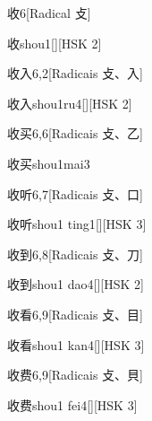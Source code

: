 \begin{entry}{收}{6}[Radical ⽁]
  \begin{phonetics}{收}{shou1}[][HSK 2]
  \end{phonetics}
\end{entry}

\begin{entry}{收入}{6,2}[Radicais ⽁、⼊]
  \begin{phonetics}{收入}{shou1ru4}[][HSK 2]
  \end{phonetics}
\end{entry}

\begin{entry}{收买}{6,6}[Radicais ⽁、⼄]
  \begin{phonetics}{收买}{shou1mai3}
  \end{phonetics}
\end{entry}

\begin{entry}{收听}{6,7}[Radicais ⽁、⼝]
  \begin{phonetics}{收听}{shou1 ting1}[][HSK 3]
  \end{phonetics}
\end{entry}

\begin{entry}{收到}{6,8}[Radicais ⽁、⼑]
  \begin{phonetics}{收到}{shou1 dao4}[][HSK 2]
  \end{phonetics}
\end{entry}

\begin{entry}{收看}{6,9}[Radicais ⽁、⽬]
  \begin{phonetics}{收看}{shou1 kan4}[][HSK 3]
  \end{phonetics}
\end{entry}

\begin{entry}{收费}{6,9}[Radicais ⽁、⾙]
  \begin{phonetics}{收费}{shou1 fei4}[][HSK 3]
  \end{phonetics}
\end{entry}

